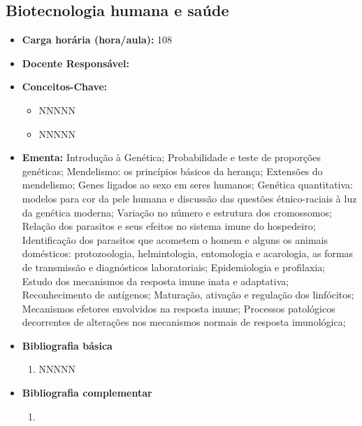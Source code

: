 \documentclass[11pt,fleqn]{book} %
\begin{document}
\subsection{Biotecnologia humana e saúde}\label{disc:biotecSaude}
\begin{itemize}
	\item \textbf{Carga horária (hora/aula):} 108
	\item \textbf{Docente Responsável:}
	\item \textbf{Conceitos-Chave:}
	\begin{itemize}
		\item NNNNN
		\item NNNNN
	\end{itemize}
	\item \textbf{Ementa:} Introdução à Genética;
	Probabilidade e teste de proporções genéticas; 
	Mendelismo: os princípios básicos da herança; 
	Extensões do mendelismo; 
	Genes ligados ao sexo em seres humanos;
	Genética quantitativa: modelos para cor da pele humana e discussão das questões étnico-raciais à luz da genética moderna;
	Variação no número e estrutura dos cromossomos;
	Relação dos parasitos e seus efeitos no sistema imune do hospedeiro; 
	Identificação dos parasitos que acometem o homem e alguns os animais domésticos: protozoologia, helmintologia, entomologia e acarologia, as formas de transmissão e diagnósticos laboratoriais; 
	Epidemiologia e profilaxia; 
	Estudo dos mecanismos da resposta imune inata e adaptativa; 
	Reconhecimento de antígenos; 
	Maturação, ativação e regulação dos linfócitos;
	Mecanismos efetores envolvidos na resposta imune;
	Processos patológicos decorrentes de alterações nos mecanismos normais de resposta imunológica;
	\item \textbf{Bibliografia básica}
	\begin{enumerate}
		\item NNNNN
	\end{enumerate}
	\item \textbf{Bibliografia complementar}
	\begin{enumerate}
		\item 
	\end{enumerate}	
\end{itemize}


\newpage
\end{document}
